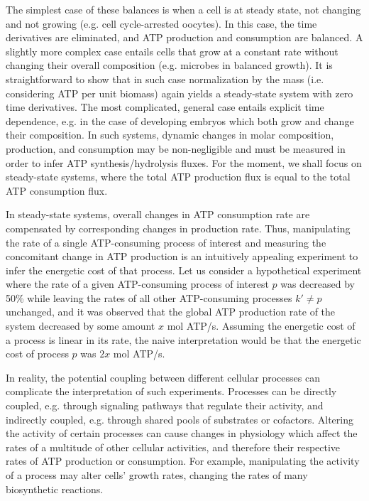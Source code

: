 \documentclass{compactarticle}
\begin{document}
The simplest case of these balances is when a cell is at steady state, not changing and not growing (e.g. cell cycle-arrested oocytes). In this case, the time derivatives are eliminated, and ATP production and consumption are balanced. A slightly more complex case entails cells that grow at a constant rate without changing their overall composition (e.g. microbes in balanced growth). It is straightforward to show that in such case normalization by the mass (i.e. considering ATP per unit biomass) again yields a steady-state system with zero time derivatives. The most complicated, general case entails explicit time dependence, e.g. in the case of developing embryos which both grow and change their composition. In such systems, dynamic changes in molar composition, production, and consumption may be non-negligible and must be measured in order to infer ATP synthesis/hydrolysis fluxes. For the moment, we shall focus on steady-state systems, where the total ATP production flux is equal to the total ATP consumption flux.

In steady-state systems, overall changes in ATP consumption rate are compensated by corresponding changes in production rate. Thus, manipulating the rate of a single ATP-consuming process of interest and measuring the concomitant change in ATP production is an intuitively appealing experiment to infer the energetic cost of that process. Let us consider a hypothetical experiment where the rate of a given ATP-consuming process of interest $ p $ was decreased by 50\% while leaving the rates of all other ATP-consuming processes $k' \neq p$ unchanged, and it was observed that the global ATP production rate of the system decreased by some amount $ x $ mol ATP/s. Assuming the energetic cost of a process is linear in its rate, the naive interpretation would be that the energetic cost of process $ p $ was $ 2 x $ mol ATP/s.

In reality, the potential coupling between different cellular processes can complicate the interpretation of such experiments. Processes can be directly coupled, e.g. through signaling pathways that regulate their activity, and indirectly coupled, e.g. through shared pools of substrates or cofactors. Altering the activity of certain processes can cause changes in physiology which affect the rates of a multitude of other cellular activities, and therefore their respective rates of ATP production or consumption. For example, manipulating the activity of a process may alter cells' growth rates, changing the rates of many biosynthetic reactions. 
\end{document}
